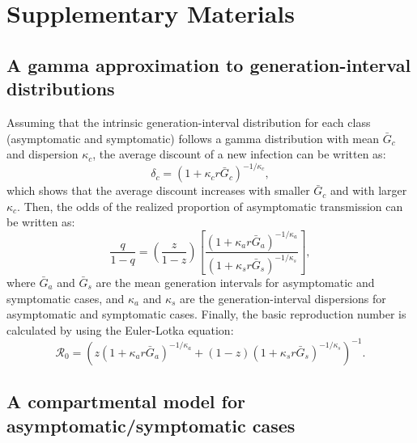 \section*{Supplementary Materials}
\renewcommand\thefigure{S\arabic{figure}}
\renewcommand\theequation{S\arabic{equation}}
\setcounter{figure}{0}
\setcounter{equation}{0}

\subsection*{A gamma approximation to generation-interval distributions}

Assuming that the intrinsic generation-interval distribution for each class (asymptomatic and symptomatic) follows a gamma distribution with mean $\bar G_c$ and dispersion $\kappa_c$, the average discount of a new infection can be written as:
\begin{equation}
\delta_c = (1 + \kappa_c r \bar G_c)^{-1/\kappa_c},
\end{equation}
which shows that the average discount increases with smaller $\bar G_c$ and with larger $\kappa_c$.
Then, the odds of the realized proportion of asymptomatic transmission can be written as:
\begin{equation}
\frac{q}{1-q}=\left(\frac{z}{1-z}\right)\left[\frac{(1 + \kappa_a r \bar G_a)^{-1/\kappa_a}}{(1 + \kappa_s r \bar G_s)^{-1/\kappa_s}}\right],
\end{equation}
where $\bar G_a$ and $\bar G_s$ are the mean generation intervals for asymptomatic and symptomatic cases, and $\kappa_a$ and $\kappa_s$ are the generation-interval dispersions for asymptomatic and symptomatic cases.
Finally, the basic reproduction number is calculated by using the Euler-Lotka equation:
\begin{equation}
\mathcal R_0 = \left(z (1 + \kappa_a r \bar G_a)^{-1/\kappa_a} + (1-z) (1 + \kappa_s r \bar G_s)^{-1/\kappa_s}\right)^{-1}.
\end{equation}

\subsection*{A compartmental model for asymptomatic/symptomatic cases}

